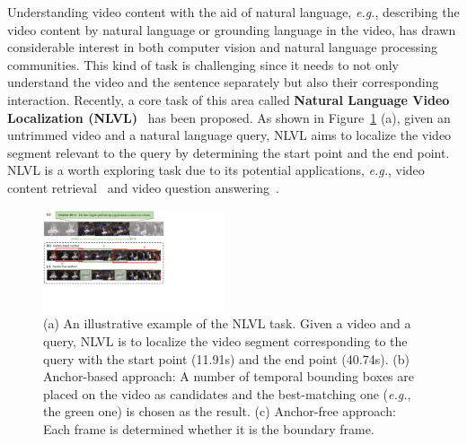 \documentclass[letterpaper]{article} %
\newcommand{\eg}{\emph{e.g.}}
\begin{document}
Understanding video content with the aid of natural language, \eg, describing the video content by natural language or
grounding language in the video, has drawn considerable interest in both computer vision and natural language processing communities.
This kind of task is challenging since it needs to not only understand the video and the sentence separately but also their corresponding interaction.
Recently, a core task of this area called \textbf{Natural Language Video Localization (NLVL)}~\cite{DBLP:conf/iccv/GaoSYN17,DBLP:conf/iccv/HendricksWSSDR17} has been proposed.
As shown in Figure~\ref{figure1} (a), given an untrimmed video and a natural language query, NLVL aims to localize the video segment relevant to the query by determining the start point and the end point.
NLVL is a worth exploring task due to its potential applications, \eg, video content retrieval~\cite{DBLP:conf/eccv/ShaoXZHQL18} and video question answering~\cite{DBLP:conf/emnlp/LeiYBB18,xiao2020hierarchical,ye2017video}.

\begin{figure}[t]
    \centering
    \includegraphics[width=0.475\textwidth]{figure1_1_cut.pdf} %
    \caption{(a) An illustrative example of the NLVL task.
    Given a video and a query, NLVL is to localize the video segment corresponding to the query with the
    start point (11.91s) and the end point (40.74s).
    (b) Anchor-based approach: A number of temporal bounding boxes are placed on the video as candidates
    and the best-matching one (\eg, the green one) is chosen as the result.
    (c) Anchor-free approach: Each frame is determined whether it is the boundary frame.
    }
    \label{figure1}
\end{figure}
\end{document}
